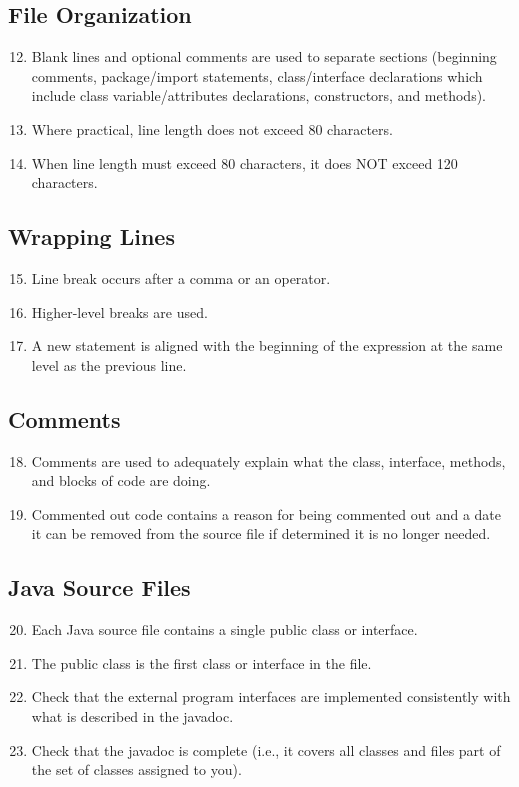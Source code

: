 	\subsection{File Organization}
	\begin{enumerate}
		\setcounter{enumi}{11}
		\item Blank lines and optional comments are used to separate sections (beginning comments, package/import statements, class/interface declarations which include class variable/attributes declarations, constructors, and methods).
		\item Where practical, line length does not exceed 80 characters.
		\item When line length must exceed 80 characters, it does NOT exceed 120 characters.
	\end{enumerate}
	\subsection{Wrapping Lines}
	\begin{enumerate}
		\setcounter{enumi}{14}
		\item Line break occurs after a comma or an operator.
		\item Higher-level breaks are used.
		\item A new statement is aligned with the beginning of the expression at the same level as the previous line.
	\end{enumerate}
	\subsection{Comments}
	\begin{enumerate}
		\setcounter{enumi}{17}
		\item Comments are used to adequately explain what the class, interface, methods, and blocks of code are doing.
		\item Commented out code contains a reason for being commented out and a date it can be removed from the source file if determined it is no longer needed.
	\end{enumerate}
	\subsection{Java Source Files}
	\begin{enumerate}
		\setcounter{enumi}{19}
		\item Each Java source file contains a single public class or interface.
		\item The public class is the first class or interface in the file.
		\item Check that the external program interfaces are implemented consistently with what is described in the javadoc.
		\item Check that the javadoc is complete (i.e., it covers all classes and files part of the set of classes assigned to you).
	\end{enumerate}
